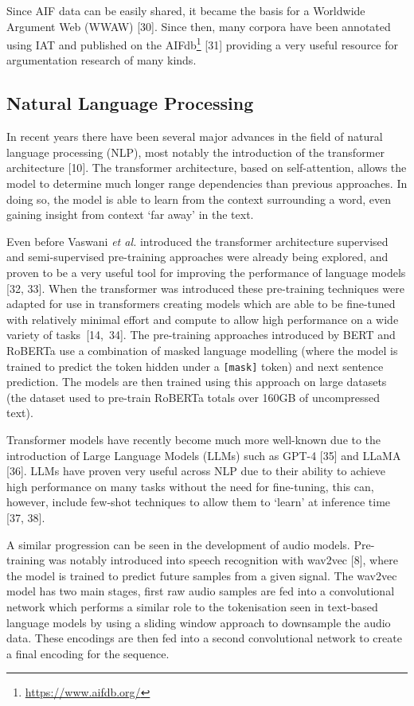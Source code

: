 \documentclass[twocolumn]{article}
\begin{document}
Since AIF data can be easily shared, it became the basis for a Worldwide
Argument Web (WWAW) {[}30{]}. Since then, many corpora have been
annotated using IAT and published on the AIFdb\footnote{\url{https://www.aifdb.org/}}
{[}31{]} providing a very useful resource for argumentation research of
many kinds.

\subsection{Natural Language Processing}\label{sec:background-ml}

In recent years there have been several major advances in the field of
natural language processing (NLP), most notably the introduction of the
transformer architecture {[}10{]}. The transformer architecture, based
on self-attention, allows the model to determine much longer range
dependencies than previous approaches. In doing so, the model is able to
learn from the context surrounding a word, even gaining insight from
context `far away' in the text.

Even before Vaswani \emph{et al.} introduced the transformer
architecture supervised and semi-supervised pre-training approaches were
already being explored, and proven to be a very useful tool for
improving the performance of language models {[}32, 33{]}. When
the transformer was introduced these pre-training techniques were
adapted for use in transformers creating models which are able to be
fine-tuned with relatively minimal effort and compute to allow high
performance on a wide variety of \mbox{tasks {[}14, 34{]}.} The
pre-training approaches introduced by BERT and RoBERTa use a combination
of masked language modelling (where the model is trained to predict the
token hidden under a \texttt{{[}mask{]}} token) and next sentence
prediction. The models are then trained using this approach on large
datasets (the dataset used to pre-train RoBERTa totals over 160GB of
uncompressed text).

Transformer models have recently become much more well-known due to the
introduction of Large Language Models (LLMs) such as GPT-4 {[}35{]} and
LLaMA {[}36{]}. LLMs have proven very useful across NLP due to their
ability to achieve high performance on many tasks without the need for
fine-tuning, this can, however, include few-shot techniques to allow
them to `learn' at inference time {[}37, 38{]}.

A similar progression can be seen in the development of audio models.
Pre-training was notably introduced into speech recognition with wav2vec
{[}8{]}, where the model is trained to predict future samples from a
given signal. The wav2vec model has two main stages, first raw audio
samples are fed into a convolutional network which performs a similar
role to the tokenisation seen in text-based language models by using a
sliding window approach to downsample the audio data. These encodings
are then fed into a second convolutional network to create a final
encoding for the sequence.
\end{document}
